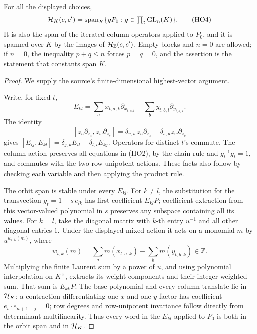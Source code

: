 \begin{srproposition}\label{prop:sr-source-harmonic-column-orbit}
For all the displayed choices,
\[
 {\cal H}_K(c,c')
       =\operatorname{span}_K\{gP_0:g\in\textstyle\prod_t
                                         \mathrm{GL}_n(K)\}.
 \tag{HO4}\label{eq:sr-source-harmonic-column-orbit}
\]
It is also the span of the iterated column operators applied to
\(P_0\), and it is spanned over \(K\) by the images of
\({\cal H}_{\mathbb Z}(c,c')\).  Empty blocks and \(n=0\) are
allowed; if \(n=0\), the inequality \(p+q\le n\) forces
\(p=q=0\), and the assertion is the statement that constants
span \(K\).
\end{srproposition}

\begin{proof}
We supply the source's finite-dimensional highest-vector argument.

Write, for fixed \(t\),
\[
 E_{kl}=\sum_a x_{t,a,k}\partial_{x_{t,a,l}}
          -\sum_b y_{t,b,l}\partial_{y_{t,b,k}}.
 \tag{HO5}\label{eq:sr-source-mixed-column-operator}
\]
The identity
\[
 [z_u\partial_{z_v},z_w\partial_{z_s}]
       =\delta_{v,w}z_u\partial_{z_s}
                      -\delta_{s,u}z_w\partial_{z_v}
\]
gives \([E_{ij},E_{kl}]=\delta_{j,k}E_{il}
-\delta_{l,i}E_{kj}\).  Operators for distinct \(t\)'s commute.
The column action preserves all equations in (HO2), by the
chain rule and \(g_t^{-1}g_t=1\), and commutes with the two row
unipotent actions.  These facts also follow by checking each
variable and then applying the product rule.

The orbit span is stable under every \(E_{kl}\).
For \(k\ne l\), the substitution for the transvection
\(g_t=1-s\,e_{lk}\) has first coefficient \(E_{kl}P\);
coefficient extraction from this vector-valued polynomial in
\(s\) preserves any subspace containing all its values.
For \(k=l\), take the diagonal matrix with \(k\)-th entry
\(u^{-1}\) and all other diagonal entries \(1\).
Under the displayed mixed action it acts on a monomial \(m\) by
\(u^{w_{t,k}(m)}\), where
\[
 w_{t,k}(m)=\sum_a m(x_{t,a,k})-\sum_bm(y_{t,b,k})\in\mathbb Z.
\]
Multiplying the finite Laurent sum by a power of \(u\), and
using polynomial interpolation on \(K^\times\), extracts its
weight components and their integer-weighted sum.
That sum is \(E_{kk}P\).
The base polynomial and every column translate lie in
\({\cal H}_K\): a contraction differentiating one \(x\) and
one \(y\) factor has coefficient \(e_i\cdot e_{n+1-j}=0\);
row degrees and row-unipotent invariance follow directly
from determinant multilinearity.
Thus every word in the \(E_{kl}\) applied to \(P_0\) is both
in the orbit span and in \({\cal H}_K\).


\end{proof}
